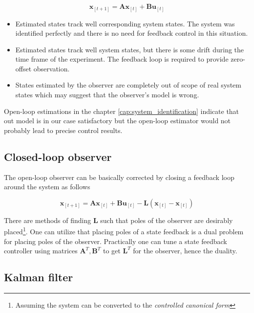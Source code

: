 \begin{equation}
\textbf{\^x}_{[t+1]} = \textbf{A}\textbf{\^x}_{[t]} + \textbf{B}\textbf{u}_{[t]}
\label{eq:openloop_observer}
\end{equation}

\begin{itemize}
\item Estimated states track well corresponding system states. The system was identified perfectly and there is no need for feedback control in this situation.
\item Estimated states track well system states, but there is some drift during the time frame of the experiment. The feedback loop is required to provide zero-offset observation.
\item States estimated by the observer are completely out of scope of real system states which may suggest that the observer's model is wrong.
\end{itemize}

Open-loop estimations in the chapter \ref{cap:system_identification} indicate that out model is in our case satisfactory but the open-loop estimator would not probably lead to precise control results.

\subsection{Closed-loop observer}

The open-loop observer can be basically corrected by closing a feedback loop around the system as follows

\begin{equation}
\textbf{\^x}_{[t+1]} = \textbf{A}\textbf{\^x}_{[t]} + \textbf{B}\textbf{u}_{[t]} - \textbf{L}\left(\textbf{x}_{[t]} - \textbf{\^x}_{[t]}\right)
\label{eq:closed_loop_observer}
\end{equation}

There are methods of finding $\textbf{L}$ such that poles of the observer are desirably placed\footnote{Assuming the system can be converted to the \textit{controlled canonical form}}. One can utilize that placing poles of a state feedback is a dual problem for placing poles of the observer. Practically one can tune a state feedback controller using matrices $\textbf{A}^T, \textbf{B}^T$ to get $\textbf{L}^T$ for the observer, hence the duality.

\subsection{Kalman filter}
\label{cap:kalman_filter_theory}


